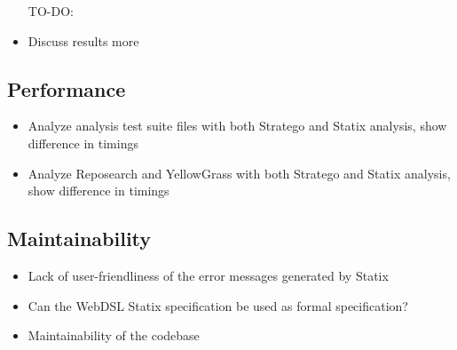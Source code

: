     \begin{itemize}
      \item[TO-DO:]
      \item Discuss results more
    \end{itemize}

  \subsection{Performance}

    \begin{itemize}
      \item Analyze analysis test suite files with both Stratego and Statix analysis, show difference in timings
      \item Analyze Reposearch and YellowGrass with both Stratego and Statix analysis, show difference in timings
    \end{itemize}

  \subsection{Maintainability}

    \begin{itemize}
      \item Lack of user-friendliness of the error messages generated by Statix
      \item Can the WebDSL Statix specification be used as formal specification?
      \item Maintainability of the codebase
    \end{itemize}
